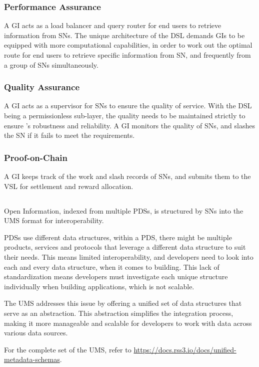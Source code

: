 \subsubsection{Performance Assurance} A GI acts as a load balancer and query router for end users to retrieve information from \glspl{SN}.
The unique architecture of the \gls{DSL} demands \glspl{GI} to be equipped with more computational capabilities, in order to work out the optimal route for end users to retrieve specific information from \gls{SN}, and frequently from a group of \glspl{SN} simultaneously.

\subsubsection{Quality Assurance} A GI acts as a supervisor for \glspl{SN} to ensure the quality of service.
With the \gls{DSL} being a permissionless sub-layer, the quality needs to be maintained strictly to ensure 's robustness and reliability.
A \gls{GI} monitors the quality of \glspl{SN}, and slashes the \gls{SN} if it fails to meet the requirements.

\subsubsection{Proof-on-Chain} A GI keeps track of the work and slash records of \glspl{SN}, and submits them to the \gls{VSL} for settlement and reward allocation.

\subsection{}
\label{subsec:UMS}

Open Information, indexed from multiple \glspl{PDS}, is structured by \glspl{SN} into the \gls{UMS} format for interoperability.

\glspl{PDS} use different data structures, within a \gls{PDS}, there might be multiple products, services and protocols that leverage a different data structure to suit their needs.
This means limited interoperability, and developers need to look into each and every data structure, when it comes to building.
This lack of standardization means developers must investigate each unique structure individually when building applications, which is not scalable.

The \gls{UMS} addresses this issue by offering a unified set of data structures that serve as an abstraction.
This abstraction simplifies the integration process, making it more manageable and scalable for developers to work with data across various data sources.

For the complete set of the \gls{UMS}, refer to \url{https://docs.rss3.io/docs/unified-metadata-schemas}.

